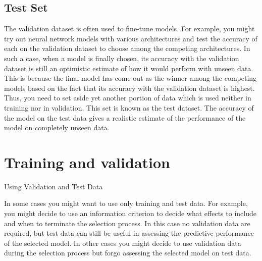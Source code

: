 \documentclass[a4paper,12pt]{article}
\begin{document}
\subsection*{Test Set}
The validation dataset is often used to fine-tune models. For example, you might try out neural network models with various architectures and test the accuracy of each on the validation dataset to choose among the competing architectures. In such a case, when a model is finally chosen, its accuracy with the validation dataset is still an optimistic estimate of how it would perform with unseen data. This is because the final model has come out as the winner among the competing models based on the fact that its accuracy with the validation dataset is highest. Thus, you need to set aside yet another portion of data which is used neither in training nor in validation. This set is known as the test dataset. The accuracy of the model on the test data gives a realistic estimate of the performance of the model on completely unseen data.

\newpage



\section{Training and validation}
Using Validation and Test Data


In some cases you might want to use only training and test data. For example, you might decide to use an information criterion to decide what effects to include and when to terminate the selection process. In this case no validation data are required, but test data can still be useful in assessing the predictive performance of the selected model. In other cases you might decide to use validation data during the selection process but forgo assessing the selected model on test data. 
\end{document}
